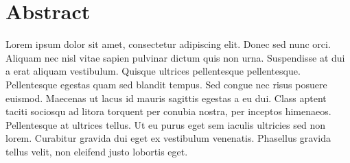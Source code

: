\chapter*{Abstract}\label{abtract}

Lorem ipsum dolor sit amet, consectetur adipiscing elit. Donec sed nunc orci.
Aliquam nec nisl vitae sapien pulvinar dictum quis non urna. Suspendisse at dui a
erat aliquam vestibulum. Quisque ultrices pellentesque pellentesque. Pellentesque
egestas quam sed blandit tempus. Sed congue nec risus posuere euismod. Maecenas ut
lacus id mauris sagittis egestas a eu dui. Class aptent taciti sociosqu ad
litora torquent per conubia nostra, per inceptos himenaeos. Pellentesque at
ultrices tellus. Ut eu purus eget sem iaculis ultricies sed non lorem. Curabitur
gravida dui eget ex vestibulum venenatis. Phasellus gravida tellus velit, non
eleifend justo lobortis eget\cite{dalal}.
